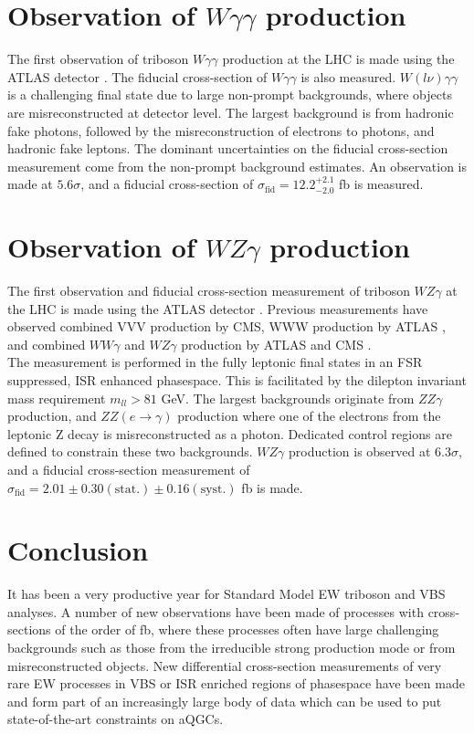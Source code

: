 \documentclass{v23windows}
\begin{document}
\section{Observation of $W\gamma\gamma$ production}
The first observation of triboson $W\gamma\gamma$ production at the LHC is made using the ATLAS detector \cite{wyy}. The fiducial cross-section of $W\gamma\gamma$ is also measured. $W(l\nu)\gamma\gamma$ is a challenging final state due to large non-prompt backgrounds, where objects are misreconstructed at detector level. The largest background is from hadronic fake photons, followed by the misreconstruction of electrons to photons, and hadronic fake leptons. The dominant uncertainties on the fiducial cross-section measurement come from the non-prompt background estimates. An observation is made at $5.6\sigma$, and a fiducial cross-section of $\sigma_{\mathrm{fid}}=12.2^{+2.1}_{-2.0}$ fb is measured.

\section{Observation of $WZ\gamma$ production}
The first observation and fiducial cross-section measurement of triboson $WZ\gamma$ at the LHC is made using the ATLAS detector \cite{wzy}. Previous measurements have observed combined VVV production \cite{vvv} by CMS, WWW production by ATLAS \cite{www}, and combined $WW\gamma$ and $WZ\gamma$ production by ATLAS \cite{wwywzy_atlas} and CMS \cite{wwywzy_cms}.\\
The measurement is performed in the fully leptonic final states in an FSR suppressed, ISR enhanced phasespace. This is facilitated by the dilepton invariant mass requirement $m_{ll}>81$ GeV. The largest backgrounds originate from $ZZ\gamma$ production, and $ZZ(e\rightarrow\gamma)$ production where one of the electrons from the leptonic Z decay is misreconstructed as a photon. Dedicated control regions are defined to constrain these two backgrounds. $WZ\gamma$ production is observed at $6.3\sigma$, and a fiducial cross-section measurement of $\sigma_{\mathrm{fid}}=2.01\pm0.30(\mathrm{stat.})\pm0.16(\mathrm{syst.})$ fb is made.
\section{Conclusion}
It has been a very productive year for Standard Model EW triboson and VBS analyses. A number of new observations have been made of processes with cross-sections of the order of fb, where these processes often have large challenging backgrounds such as those from the irreducible strong production mode or from misreconstructed objects. New differential cross-section measurements of very rare EW processes in VBS or ISR enriched regions of phasespace have been made and form part of an increasingly large body of data which can be used to put state-of-the-art constraints on aQGCs. 
%
%
\end{document}
